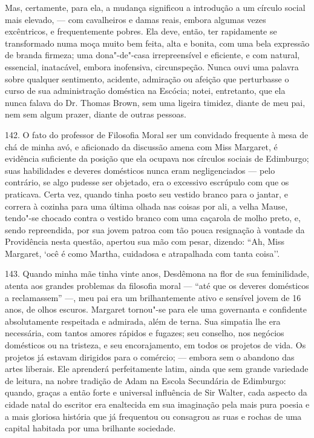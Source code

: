 Mas, certamente, para ela, a mudança significou a introdução a um
círculo social mais elevado, --- com cavalheiros e damas reais, embora
algumas vezes excêntricos, e frequentemente pobres. Ela deve, então, ter
rapidamente se transformado numa moça muito bem feita, alta e bonita,
com uma bela expressão de branda firmeza; uma dona"-de"-casa
irrepreensível e eficiente, e com natural, essencial, inatacável, embora
inofensiva, circunspeção. Nunca ouvi uma palavra sobre qualquer
sentimento, acidente, admiração ou afeição que perturbasse o curso de
sua administração doméstica na Escócia; notei, entretanto, que ela nunca
falava do Dr. Thomas Brown, sem uma ligeira timidez, diante de meu pai,
nem sem algum prazer, diante de outras pessoas.

142. O fato do professor de Filosofia Moral ser um convidado frequente à
mesa de chá de minha avó, e aficionado da discussão amena com Miss
Margaret, é evidência suficiente da posição que ela ocupava nos círculos
sociais de Edimburgo; suas habilidades e deveres domésticos nunca eram
negligenciados --- pelo contrário, se algo pudesse ser objetado, era o
excessivo escrúpulo com que os praticava. Certa vez, quando tinha posto
seu vestido branco para o jantar, e correra à cozinha para uma última
olhada nas coisas por ali, a velha Mause, tendo"-se chocado contra o
vestido branco com uma caçarola de molho preto, e, sendo repreendida,
por sua jovem patroa com tão pouca resignação à vontade da Providência
nesta questão, apertou sua mão com pesar, dizendo: ``Ah, Miss Margaret,
`ocê é como Martha, cuidadosa e atrapalhada com tanta coisa''.

143. Quando minha mãe tinha vinte anos, Desdêmona na flor de sua
feminilidade, atenta aos grandes problemas da filosofia moral --- ``até
que os deveres domésticos a reclamassem'' ---, meu pai era um
brilhantemente ativo e sensível jovem de 16 anos, de olhos escuros.
Margaret tornou"-se para ele uma governanta e confidente absolutamente
respeitada e admirada, além de terna. Sua simpatia lhe era necessária,
com tantos amores rápidos e fugazes; seu conselho, nos negócios
domésticos ou na tristeza, e seu encorajamento, em todos os projetos de
vida. Os projetos já estavam dirigidos para o comércio; --- embora sem o
abandono das artes liberais. Ele aprenderá perfeitamente latim, ainda
que sem grande variedade de leitura, na nobre tradição de Adam na Escola
Secundária de Edimburgo: quando, graças a então forte e universal
influência de Sir Walter, cada aspecto da cidade natal do escritor era
enaltecida em sua imaginação pela mais pura poesia e a mais gloriosa
história que já frequentou ou consagrou as ruas e rochas de uma capital
habitada por uma brilhante sociedade.

